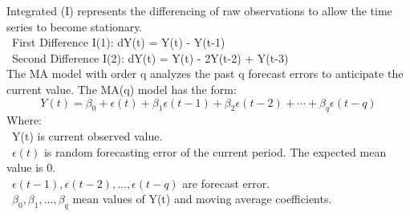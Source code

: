 \documentclass{ieeeojies}
\begin{document}
 Integrated (I) represents the differencing of raw observations to allow the time series to become stationary.\\
    \indent\textbullet\ First Difference I(1): dY(t) = Y(t) - Y(t-1)\\
    \indent\textbullet\ Second Difference I(2): dY(t) = Y(t) - 2Y(t-2) + Y(t-3)\\
 
The MA model with order q analyzes the past q forecast errors to anticipate the current value. The MA(q) model has the form:
  \[Y(t)=\beta_0+\epsilon(t)+\beta_1\epsilon(t-1)+\beta_2\epsilon(t-2)+\cdots+\beta_q\epsilon(t-q)\]
        Where:\\
	    \indent\textbullet\ Y(t) is current observed value.\\
            \indent\textbullet\ \(\epsilon(t)\) is random forecasting error of the current period. The expected mean value is 0.\\
            \indent\textbullet\ \(\epsilon(t-1), \epsilon(t-2), \ldots, \epsilon(t-q)\) are forecast error.\\
            \indent\textbullet\ \(\beta_0, \beta_1, \ldots, \beta_q\) mean values of Y(t) and moving average coefficients.\\
\end{document}
